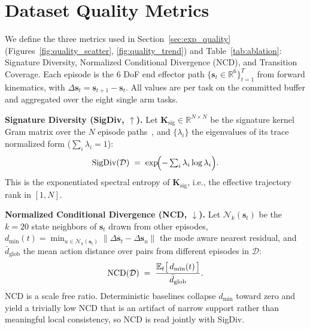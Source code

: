 \documentclass{article}
\begin{document}


\clearpage
\appendix
\renewcommand{\thetable}{A\arabic{table}}
\renewcommand{\thefigure}{A\arabic{figure}}
\setcounter{table}{0}
\setcounter{figure}{0}


\section{Dataset Quality Metrics}
\label{app:metrics}

We define the three metrics used in Section~\ref{sec:exp_quality} (Figures~\ref{fig:quality_scatter}, \ref{fig:quality_trend}) and Table~\ref{tab:ablation}: Signature Diversity, Normalized Conditional Divergence (NCD), and Transition Coverage. Each episode is the $6$ DoF end effector path $\{\mathbf{s}_t\!\in\!\mathbb{R}^{6}\}_{t=1}^{T}$ from forward kinematics, with $\Delta\mathbf{s}_t\!=\!\mathbf{s}_{t+1}\!-\!\mathbf{s}_t$. All values are per task on the committed buffer and aggregated over the eight single arm tasks.

\textbf{Signature Diversity (SigDiv, $\uparrow$).}
Let $\mathbf{K}_{\mathrm{sig}}\!\in\!\mathbb{R}^{N\times N}$ be the signature kernel Gram matrix over the $N$ episode paths~\citep{faktual2026}, and $\{\lambda_i\}$ the eigenvalues of its trace normalized form ($\sum_i\lambda_i\!=\!1$):
\begin{equation} \small
\mathrm{SigDiv}(\mathcal{D}) \;=\; \exp\!\Bigl(-\textstyle\sum_{i}\lambda_i\log\lambda_i\Bigr).
\label{eq:metric-sigdiv}
\end{equation}
This is the exponentiated spectral entropy of $\mathbf{K}_{\mathrm{sig}}$, i.e., the effective trajectory rank in $[1, N]$.

\textbf{Normalized Conditional Divergence (NCD, $\downarrow$).}
Let $\mathcal{N}_k(\mathbf{s}_t)$ be the $k\!=\!20$ state neighbors of $\mathbf{s}_t$ drawn from other episodes, $d_{\min}(t)\!=\!\min_{u\in\mathcal{N}_k(\mathbf{s}_t)}\lVert\Delta\mathbf{s}_t-\Delta\mathbf{s}_u\rVert$ the mode aware nearest residual, and $\bar d_{\mathrm{glob}}$ the mean action distance over pairs from different episodes in $\mathcal{D}$:
\begin{equation} \small
\mathrm{NCD}(\mathcal{D}) \;=\; \frac{\mathbb{E}_t\bigl[\,d_{\min}(t)\,\bigr]}{\bar d_{\mathrm{glob}}}.
\label{eq:metric-ncd}
\end{equation}
NCD is a scale free ratio. Deterministic baselines collapse $d_{\min}$ toward zero and yield a trivially low NCD that is an artifact of narrow support rather than meaningful local consistency, so NCD is read jointly with SigDiv.
\end{document}
